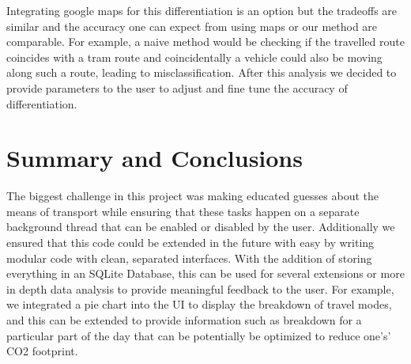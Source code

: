 \documentclass[10pt,conference,compsocconf]{IEEEtran}
\begin{document}
Integrating google maps for this differentiation is an option but the tradeoffs are similar and the accuracy one can expect from using maps or our method are comparable. For example, a naive method would be checking if the travelled route coincides with a tram route and coincidentally a vehicle could also be moving along such a route, leading to misclassification. After this analysis we decided to provide parameters to the user to adjust and fine tune the accuracy of differentiation.

\section{Summary and Conclusions}

The biggest challenge in this project was making educated guesses about the means of transport while ensuring that these tasks happen on a separate background thread that can be enabled or disabled by the user. Additionally we ensured that this code could be extended in the future with easy by writing modular code with clean, separated interfaces. With the addition of storing everything in an SQLite Database, this can be used for several extensions or more in depth data analysis to provide meaningful feedback to the user. For example, we integrated a pie chart into the UI to display the breakdown of travel modes, and this can be extended to provide information such as breakdown for a particular part of the day that can be potentially be optimized to reduce one's’ CO2 footprint.





\clearpage
\end{document}
